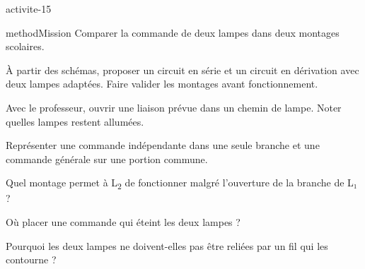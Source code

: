\documentclass[12pt,twoside,openany]{book}
\begin{document}
\label{ch-15-activite}
\begin{pcFiche}{activite-15}
\begin{pcEncadre}{method}{Mission}
Comparer la commande de deux lampes dans deux montages scolaires.\par
\end{pcEncadre}
\begin{questions}
\item À partir des schémas, proposer un circuit en série et un circuit en dérivation avec deux lampes adaptées. Faire valider les montages avant fonctionnement.
\item Avec le professeur, ouvrir une liaison prévue dans un chemin de lampe. Noter quelles lampes restent allumées.
\item Représenter une commande indépendante dans une seule branche et une commande générale sur une portion commune.
\end{questions}
\begin{questions}
\item Quel montage permet à L\textsubscript{2} de fonctionner malgré l’ouverture de la branche de L₁ ?
\item Où placer une commande qui éteint les deux lampes ?
\item Pourquoi les deux lampes ne doivent-elles pas être reliées par un fil qui les contourne ?
\end{questions}
\end{pcFiche}
\label{ch-15-bilan}
\end{document}
